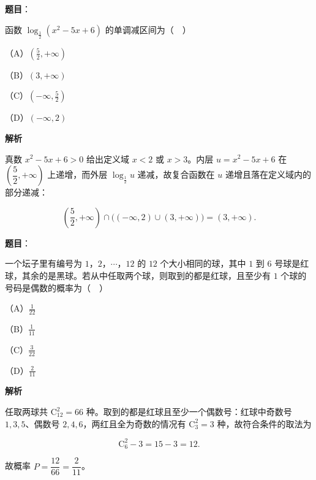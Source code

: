 \begin{answer}

\textbf{题目}：

函数 $\log_{\frac12}(x^2-5x+6)$ 的单调减区间为（　）

（A）$\left(\frac52,+\infty\right)$

（B）$(3,+\infty)$

（C）$\left(-\infty,\frac52\right)$

（D）$(-\infty,2)$

\textbf{解析}

真数 $x^2-5x+6>0$ 给出定义域 $x<2$ 或 $x>3$。内层 $u=x^2-5x+6$ 在 $\left(\dfrac52,+\infty\right)$ 上递增，而外层 $\log_{\frac12}u$ 递减，故复合函数在 $u$ 递增且落在定义域内的部分递减：

\nopagebreak[4]
\[\left(\frac52,+\infty\right)\cap\bigl((-\infty,2)\cup(3,+\infty)\bigr)=(3,+\infty).\]


\end{answer}
\begin{answer}

\textbf{题目}：

一个坛子里有编号为 $1$，$2$，$\cdots$，$12$ 的 $12$ 个大小相同的球，其中 $1$ 到 $6$ 号球是红球，其余的是黑球。若从中任取两个球，则取到的都是红球，且至少有 $1$ 个球的号码是偶数的概率为（　）

（A）$\frac1{22}$

（B）$\frac1{11}$

（C）$\frac3{22}$

（D）$\frac2{11}$

\textbf{解析}

任取两球共 $\mathrm C_{12}^2=66$ 种。取到的都是红球且至少一个偶数号：红球中奇数号 $1,3,5$、偶数号 $2,4,6$，两红且全为奇数的情况有 $\mathrm C_3^2=3$ 种，故符合条件的取法为

\nopagebreak[4]
\[\mathrm C_6^2-3=15-3=12.\]

故概率 $P=\dfrac{12}{66}=\dfrac2{11}$。


\end{answer}
